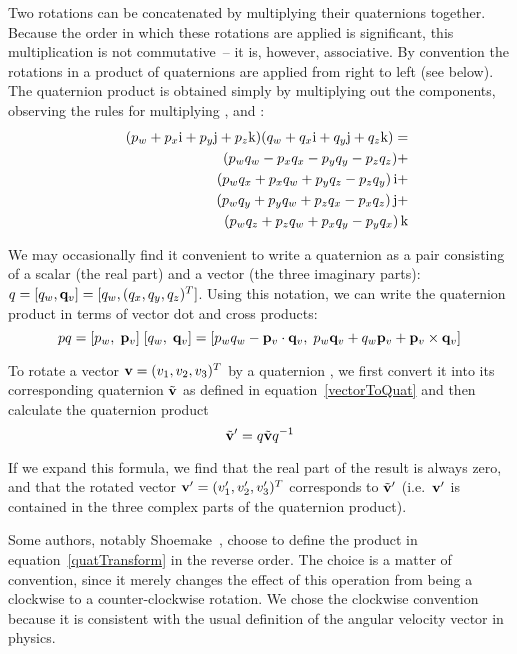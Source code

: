 Two rotations can be concatenated by multiplying their quaternions together. Because the order
in which these rotations are applied is significant, this multiplication is not commutative~--
it is, however, associative. By convention the rotations in a product of quaternions are applied
from right to left (see below). The quaternion product is obtained simply by multiplying out the
components, observing the rules for multiplying \qi{}, \qj{} and \qk{}:
\begin{eqnarray}
&& (p_w + p_x\mathrm{i} + p_y\mathrm{j} + p_z\mathrm{k})(q_w + q_x\mathrm{i} + q_y\mathrm{j} + q_z\mathrm{k}) = \nonumber\\*
&& \quad\quad\quad (p_w q_w - p_x q_x - p_y q_y - p_z q_z) + \nonumber\\*
&& \quad\quad\quad (p_w q_x + p_x q_w + p_y q_z - p_z q_y) \,\mathrm{i} + \nonumber\\*
&& \quad\quad\quad (p_w q_y + p_y q_w + p_z q_x - p_x q_z) \,\mathrm{j} + \nonumber\\*
&& \quad\quad\quad (p_w q_z + p_z q_w + p_x q_y - p_y q_x) \,\mathrm{k} \label{quatProduct}
\end{eqnarray}

We may occasionally find it convenient to write a quaternion as a pair consisting of a scalar
(the real part) and a vector (the three imaginary parts):
$\q{q} = [q_w, \ve{q}_v] = [q_w, (q_x, q_y, q_z)^T]$. Using this notation, we can write the
quaternion product in terms of vector dot and cross products:
\begin{equation} \label{quatProduct2}
\q{p}\q{q} = [p_w,\; \ve{p}_v]\;[q_w,\; \ve{q}_v] =
    [p_w q_w - \ve{p}_v \cdot \ve{q}_v,\;
    p_w \ve{q}_v + q_w \ve{p}_v + \ve{p}_v \times \ve{q}_v]
\end{equation}

To rotate a vector $\ve{v} = (v_1, v_2, v_3)^T$ by a quaternion , we first
convert it into its corresponding quaternion $\tilde{\ve{v}}$ as defined in
equation~\ref{vectorToQuat} and then calculate the quaternion product
\begin{equation}
\label{quatTransform}
\tilde{\ve{v}}' = \q{q}\tilde{\ve{v}}\q{q}^{-1}
\end{equation}

If we expand this formula, we find that the real part of the result is always zero, and
that the rotated vector $\ve{v}' = (v_1', v_2', v_3')^T$ corresponds
to $\tilde{\ve{v}}'$ (i.e.\ $\ve{v}'$ is contained in the three complex parts of
the quaternion product).

Some authors, notably Shoemake~\cite{Shoemake:85}, choose to define the product in
equation~\ref{quatTransform} in
the reverse order. The choice is a matter of convention, since it merely changes the effect
of this operation from being a clockwise to a counter-clockwise rotation. We chose the clockwise
convention because it is consistent with the usual definition of the angular velocity vector
in physics.


